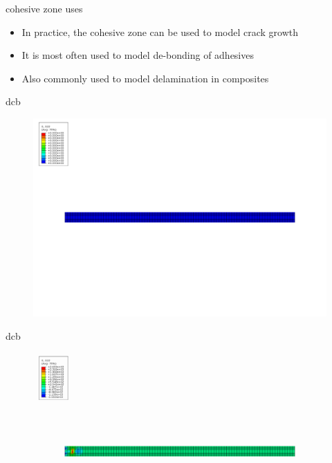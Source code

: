 \documentclass[10pt]{beamer}
\begin{document}
	\begin{frame}{cohesive zone uses}
		\begin{itemize}[<+->]
			\item In practice, the cohesive zone can be used to model crack growth
			\item It is most often used to model de-bonding of adhesives
			\item Also commonly used to model delamination in composites
		\end{itemize}
	\end{frame}
	
	\begin{frame}{dcb}
		\begin{figure}
		\centering
		\includegraphics[width=0.9\linewidth]{../Figures/dcb1}
		\end{figure}
	\end{frame}
	
	\begin{frame}{dcb}
		\begin{figure}
			\centering
			\includegraphics[width=0.9\linewidth]{../Figures/dcb2}
		\end{figure}
	\end{frame}
\end{document}
